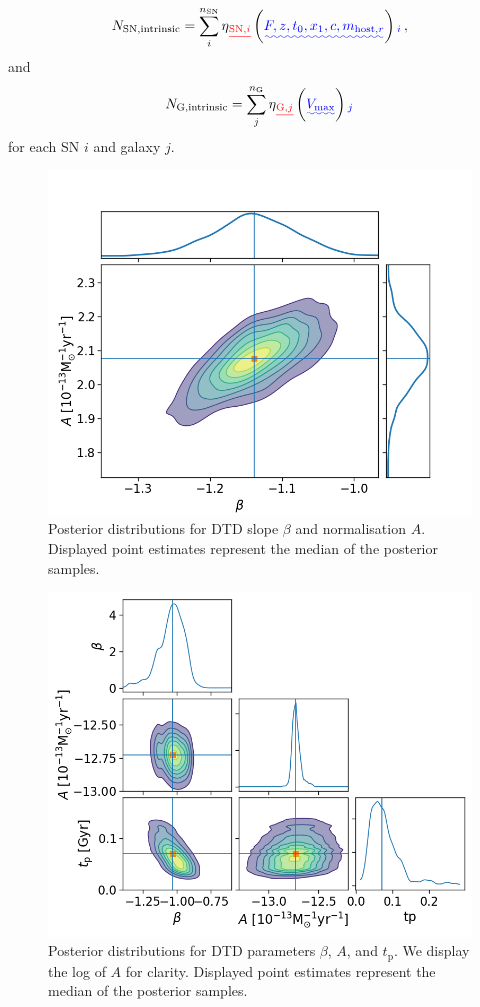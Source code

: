 \documentclass[fleqn,usenatbib]{mnras}
\providecommand{\DIFadd}[1]{{\protect\color{blue}\uwave{#1}}} %
\providecommand{\DIFdel}[1]{{\protect\color{red}\sout{#1}}}                      %
\providecommand{\DIFaddbegin}{} %
\providecommand{\DIFaddend}{} %
\providecommand{\DIFdelbegin}{} %
\providecommand{\DIFdelend}{} %
\newcommand{\DIFscaledelfig}{0.5}
\newlength{\DIFdelgraphicswidth} %
\newlength{\DIFdelgraphicsheight} %
\newcommand{\DIFaddincludegraphics}[2][]{{\color{blue}\fbox{\DIFOincludegraphics[#1]{#2}}}} %
\newcommand{\DIFdelincludegraphics}[2][]{%
\sbox{\DIFdelgraphicsbox}{\DIFOincludegraphics[#1]{#2}}%
\settoboxwidth{\DIFdelgraphicswidth}{\DIFdelgraphicsbox} %
\settoboxtotalheight{\DIFdelgraphicsheight}{\DIFdelgraphicsbox} %
\scalebox{\DIFscaledelfig}{%
\parbox[b]{\DIFdelgraphicswidth}{\usebox{\DIFdelgraphicsbox}\\[-\baselineskip] \rule{\DIFdelgraphicswidth}{0em}}\llap{\resizebox{\DIFdelgraphicswidth}{\DIFdelgraphicsheight}{%
\setlength{\unitlength}{\DIFdelgraphicswidth}%
\begin{picture}(1,1)%
\thicklines\linethickness{2pt} %
{\color[rgb]{1,0,0}\put(0,0){\framebox(1,1){}}}%
{\color[rgb]{1,0,0}\put(0,0){\line( 1,1){1}}}%
{\color[rgb]{1,0,0}\put(0,1){\line(1,-1){1}}}%
\end{picture}%
}\hspace*{3pt}}} %
} %
\DeclareRobustCommand{\DIFaddbegin}{\DIFOaddbegin \let\includegraphics\DIFaddincludegraphics} %
\DeclareRobustCommand{\DIFaddend}{\DIFOaddend \let\includegraphics\DIFOincludegraphics} %
\DeclareRobustCommand{\DIFdelbegin}{\DIFOdelbegin \let\includegraphics\DIFdelincludegraphics} %
\DeclareRobustCommand{\DIFdelend}{\DIFOaddend \let\includegraphics\DIFOincludegraphics} %
\begin{document}
\begin{equation}
    N_{\mathrm{SN,intrinsic}} = \sum_i^{n_{\mathrm{SN}}}\eta\DIFdelbegin \DIFdel{_{\mathrm{SN,}i}}\DIFdelend \DIFaddbegin \left(\DIFadd{F,z,t_0,x_1,c,m_{\mathrm{host},r}}\right)\DIFadd{_{i}}\DIFaddend \,,
    \label{eq:corr_SN}
\end{equation}
and
\begin{equation}
    N_{\mathrm{G,intrinsic}} = \sum_j^{n_{\mathrm{G}}} \eta\DIFdelbegin \DIFdel{_{\mathrm{G,}j} 
    }\DIFdelend \DIFaddbegin \left(\DIFadd{V_{\mathrm{max}}}\right)\DIFadd{_{j} 
    }\DIFaddend \label{eq:corr_G}
\end{equation}
for each SN $i$ and galaxy $j$.

\begin{figure}
    \centering
    \includegraphics[width=.5\textwidth]{figs/beta_A_Qerf1.1_corner_All.png}
    \caption{Posterior distributions for DTD slope $\beta$ and normalisation $A$. Displayed point estimates represent the median of the posterior samples.%
    \label{fig:corner_beta_norm}}
\end{figure}

\begin{figure}
    \centering
    \includegraphics[width=.5\textwidth]{figs/beta_A_tp_Qerf1.1_corner.png}
    \caption{Posterior distributions for DTD parameters $\beta$, $A$, and $t_{\mathrm{p}}$. We display the log of $A$ for clarity. Displayed point estimates represent the median of the posterior samples.
    \label{fig:corner_beta_norm_tp}}
\end{figure}
\end{document}
